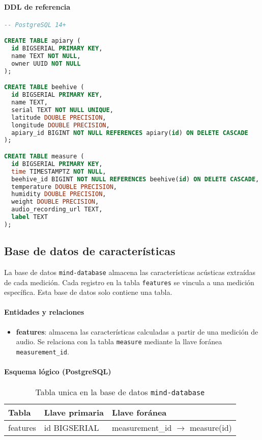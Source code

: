 \paragraph{DDL de referencia}

\begin{lstlisting}[language=SQL, label={lst:apiary-database-schema}, caption={Esquema de la base de datos beehive-nest}]
-- PostgreSQL 14+

CREATE TABLE apiary (
  id BIGSERIAL PRIMARY KEY,
  name TEXT NOT NULL,
  owner UUID NOT NULL
);

CREATE TABLE beehive (
  id BIGSERIAL PRIMARY KEY,
  name TEXT,
  serial TEXT NOT NULL UNIQUE,
  latitude DOUBLE PRECISION,
  longitude DOUBLE PRECISION,
  apiary_id BIGINT NOT NULL REFERENCES apiary(id) ON DELETE CASCADE
);

CREATE TABLE measure (
  id BIGSERIAL PRIMARY KEY,
  time TIMESTAMPTZ NOT NULL,
  beehive_id BIGINT NOT NULL REFERENCES beehive(id) ON DELETE CASCADE,
  temperature DOUBLE PRECISION,
  humidity DOUBLE PRECISION,
  weight DOUBLE PRECISION,
  audio_recording_url TEXT,
  label TEXT
);
\end{lstlisting}

\subsection{Base de datos de características}
La base de datos \texttt{mind-database} almacena las características acústicas extraídas de cada medición. Cada registro en la tabla \texttt{features} se vincula a una medición específica. Esta base de datos solo contiene una tabla.

\paragraph{Entidades y relaciones}
\begin{itemize}
  \item \textbf{features}: almacena las características calculadas a partir de una medición de audio. Se relaciona con la tabla \texttt{measure} mediante la llave foránea \texttt{measurement\_id}.
\end{itemize}

\paragraph{Esquema lógico (PostgreSQL)}
\begin{table}[H]
\centering
\caption{Tabla unica en la base de datos \texttt{mind-database}}
\label{tab:features_schema}
\begin{tabular}{|l|l|l|}
\hline
\textbf{Tabla} & \textbf{Llave primaria} & \textbf{Llave foránea} \\ \hline
features & id BIGSERIAL & measurement\_id \(\rightarrow\) measure(id) \\ \hline
\end{tabular}
\end{table}

